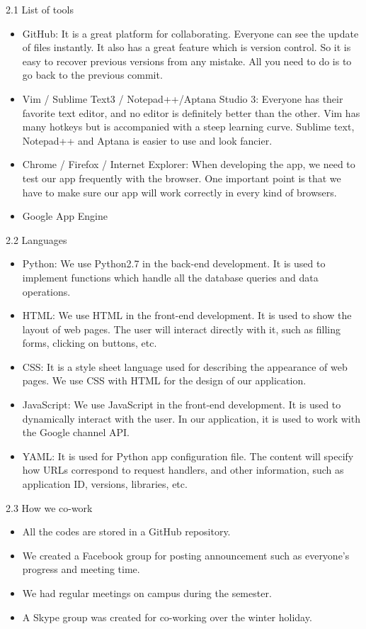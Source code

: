 \documentclass{article}
\begin{document}
2.1	List of tools
\begin{itemize}
\item GitHub: It is a great platform for collaborating. Everyone can see the update of files instantly. It also has a great feature which is version control. So it is easy to recover previous versions from any mistake. All you need to do is to go back to the previous commit.
\item Vim / Sublime Text3 / Notepad++/Aptana Studio 3: Everyone has their favorite text editor, and no editor is definitely better than the other. Vim has many hotkeys but is accompanied with a steep learning curve. Sublime text, Notepad++ and Aptana is easier to use and look fancier. 
\item Chrome / Firefox / Internet Explorer: When developing the app, we need to test our app frequently with the browser. One important point is that we have to make sure our app will work correctly in every kind of browsers.
\item Google App Engine
\end{itemize}
2.2	Languages
\begin{itemize}
\item Python: We use Python2.7 in the back-end development. It is used to implement functions which handle all the database queries and data operations.  
\item HTML: We use HTML in the front-end development. It is used to show the layout of web pages. The user will interact directly with it, such as filling forms, clicking on buttons, etc.
\item CSS: It is a style sheet language used for describing the appearance of web pages. We use CSS with HTML for the design of our application. 
\item JavaScript: We use JavaScript in the front-end development. It is used to dynamically interact with the user. In our application, it is used to work with the Google channel API. 
\item YAML: It is used for Python app configuration file. The content will specify how URLs correspond to request handlers, and other information, such as application ID, versions, libraries, etc. 
\end{itemize}
2.3	How we co-work
\begin{itemize}
\item All the codes are stored in a GitHub repository. 
\item We created a Facebook group for posting announcement such as everyone’s progress and meeting time. 
\item We had regular meetings on campus during the semester. 
\item A Skype group was created for co-working over the winter holiday.
\end{itemize}
\end{document}
